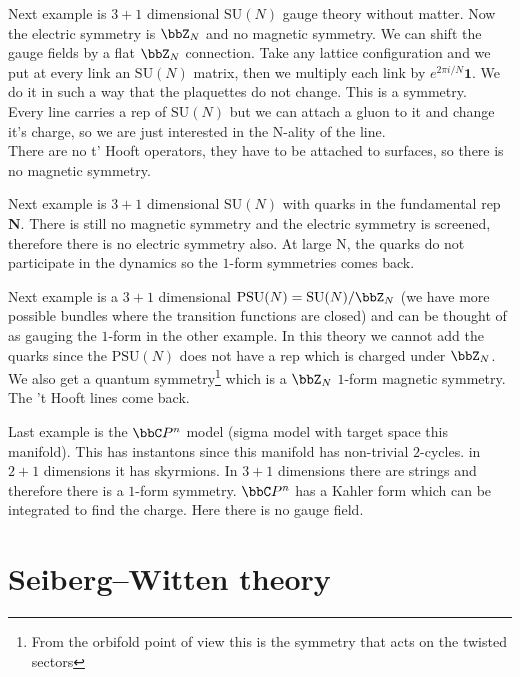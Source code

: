 \documentclass[11pt]{article}
\theoremstyle{definition}
\numberwithin{equation}{section}
\newcommand*\SU{\mathrm{SU}}
\begin{document}
Next example is $3+1$ dimensional $\SU(N)$ gauge theory without matter. Now the electric symmetry is $\bbZ_{N}$ and no magnetic symmetry. We can shift the gauge fields by a flat $\bbZ_{N}$ connection. Take any lattice configuration and we put at every link an $\SU(N)$ matrix, then we multiply each link by $e^{2\pi i/N}\mathbf{1}$. We do it in such a way that the plaquettes do not change. This is a symmetry.\\
Every line carries a rep of $\SU(N)$ but we can attach a gluon to it and change it's charge, so we are just interested in the N-ality of the line.\\
There are no t' Hooft operators, they have to be attached to surfaces, so there is no magnetic symmetry.

Next example is $3+1$ dimensional $\SU(N)$ with quarks in the fundamental rep $\mathbf{N}$. There is still no magnetic symmetry and the electric symmetry is screened, therefore there is no electric symmetry also. At large N, the quarks do not participate in the dynamics so the $1$-form symmetries comes back.

Next example is a $3+1$ dimensional $\text{PSU}(N)=\SU(N)/\bbZ_{N}$ (we have more possible bundles where the transition functions are closed) and can be thought of as gauging the $1$-form in the other example. In this theory we cannot add the quarks since the $\text{PSU}(N)$ does not have a rep which is charged under $\bbZ_{N}$. We also get a quantum symmetry\footnote{From the orbifold point of view this is the symmetry that acts on the twisted sectors} which is a $\bbZ_{N}$  $1$-form magnetic symmetry. The 't Hooft lines come back.

Last example is the $\bbC P^{n}$ model (sigma model with target space this manifold). This has instantons since this manifold has non-trivial $2$-cycles. in $2+1$ dimensions it has skyrmions. In $3+1$ dimensions there are strings and therefore there is a $1$-form symmetry. $\bbC P^{n}$ has a Kahler form which can be integrated to find the charge. Here there is no gauge field.


\section{Seiberg--Witten theory}
\end{document}
